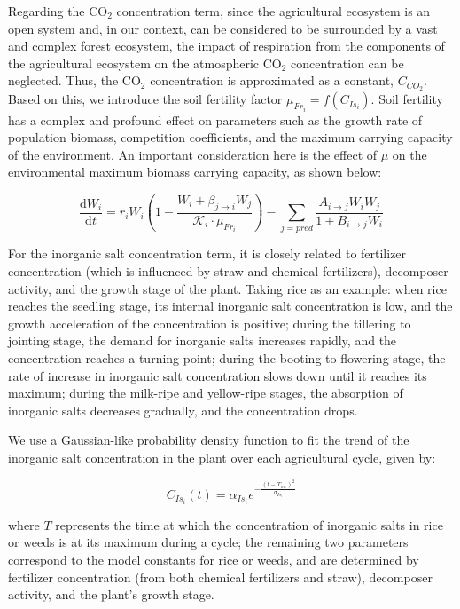 \documentclass{HZNUMCM}
\begin{document}
        Regarding the CO$_2$ concentration term, 
        since the agricultural ecosystem is an open system and, 
        in our context, can be considered to be surrounded by a vast and complex forest ecosystem, 
        the impact of respiration from the components of the agricultural ecosystem on the atmospheric CO$_2$ concentration can be neglected. 
        Thus, the CO$_2$ concentration is approximated as a constant, \( C_{CO_2} \). 
        Based on this, we introduce the soil fertility factor \( \mu_{Fr_i} = f(C_{Is_i}) \). 
        Soil fertility has a complex and profound effect on parameters such as the growth rate of population biomass, 
        competition coefficients, and the maximum carrying capacity of the environment. 
        An important consideration here is the effect of \( \mu \) on the environmental maximum biomass carrying capacity, 
        as shown below:

        \[
        \frac{\mathrm{d}W_{i}}{\mathrm{d}t} = r_{i} W_{i} \left( 1 - \frac{W_{i} + \beta_{j \rightarrow i} W_{j}}{\mathscr{K}_{i} \cdot \mu_{Fr_i}} \right) - \sum_{j=pred}{\frac{A_{i\rightarrow j} W_{i} W_{j}}{1 + B_{i\rightarrow j} W_{i}}}
        \]

        For the inorganic salt concentration term, 
        it is closely related to fertilizer concentration (which is influenced by straw and chemical fertilizers), 
        decomposer activity, and the growth stage of the plant. Taking rice as an example: when rice reaches the seedling stage, 
        its internal inorganic salt concentration is low, and the growth acceleration of the concentration is positive; 
        during the tillering to jointing stage, the demand for inorganic salts increases rapidly, and the concentration reaches a turning point; 
        during the booting to flowering stage, the rate of increase in inorganic salt concentration slows down until it reaches its maximum; 
        during the milk-ripe and yellow-ripe stages, the absorption of inorganic salts decreases gradually, and the concentration drops\cite{garcia2003logistic}.
        
        We use a Gaussian-like probability density function to fit the trend of the inorganic salt concentration in the plant over each agricultural cycle, given by:
        
        \[
        C_{Is_i}(t) = \alpha_{Is_i} e^{-\frac{(t - T_{mc})^2}{\sigma_{Is_i}}}
        \]

        where \( T \) represents the time at which the concentration of inorganic salts in rice or weeds is at its maximum during a cycle; the remaining two parameters correspond to the model constants for rice or weeds, 
        and are determined by fertilizer concentration (from both chemical fertilizers and straw), decomposer activity, and the plant's growth stage.
\end{document}

